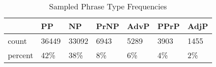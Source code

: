 \begin{table}[htbp!]
\centering
\caption{Sampled Phrase Type Frequencies}
\label{table:type_counts}
\begin{tabular}{lllllll}
\toprule
{} &     PP &     NP &  PrNP &  AdvP &  PPrP &  AdjP \\
\midrule
count   &  36449 &  33092 &  6943 &  5289 &  3903 &  1455 \\
percent &    42\% &    38\% &    8\% &    6\% &    4\% &    2\% \\
\bottomrule
\end{tabular}
\end{table}

